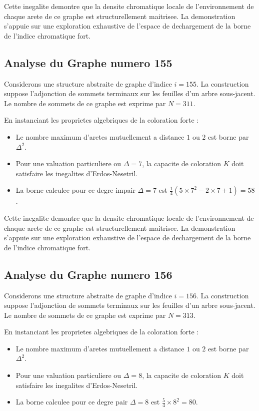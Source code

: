 \documentclass[11pt,a4paper]{article}
\begin{document}
Cette inegalite demontre que la densite chromatique locale de l'environnement de chaque arete de ce graphe est structurellement maitrisee. La demonstration s'appuie sur une exploration exhaustive de l'espace de dechargement de la borne de l'indice chromatique fort.

\subsection{Analyse du Graphe numero 155}
Considerons une structure abstraite de graphe d'indice $i = 155$. La construction suppose l'adjonction de sommets terminaux sur les feuilles d'un arbre sous-jacent. Le nombre de sommets de ce graphe est exprime par $N = 311$.

En instanciant les proprietes algebriques de la coloration forte :
\begin{itemize}
\item Le nombre maximum d'aretes mutuellement a distance $1$ ou $2$ est borne par $\Delta^2$.
\item Pour une valuation particuliere ou $\Delta = 7$, la capacite de coloration $K$ doit satisfaire les inegalites d'Erdos-Nesetril.
\item La borne calculee pour ce degre impair $\Delta = 7$ est $\frac{1}{4}(5 \times 7^2 - 2 \times 7 + 1) = 58$.
\end{itemize}

Cette inegalite demontre que la densite chromatique locale de l'environnement de chaque arete de ce graphe est structurellement maitrisee. La demonstration s'appuie sur une exploration exhaustive de l'espace de dechargement de la borne de l'indice chromatique fort.

\subsection{Analyse du Graphe numero 156}
Considerons une structure abstraite de graphe d'indice $i = 156$. La construction suppose l'adjonction de sommets terminaux sur les feuilles d'un arbre sous-jacent. Le nombre de sommets de ce graphe est exprime par $N = 313$.

En instanciant les proprietes algebriques de la coloration forte :
\begin{itemize}
\item Le nombre maximum d'aretes mutuellement a distance $1$ ou $2$ est borne par $\Delta^2$.
\item Pour une valuation particuliere ou $\Delta = 8$, la capacite de coloration $K$ doit satisfaire les inegalites d'Erdos-Nesetril.
\item La borne calculee pour ce degre pair $\Delta = 8$ est $\frac{5}{4} \times 8^2 = 80$.
\end{itemize}
\end{document}
